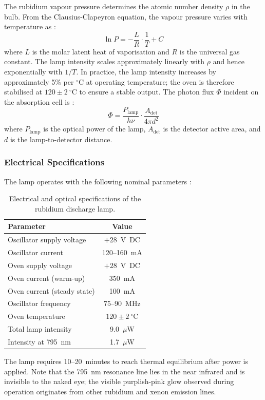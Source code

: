 The rubidium vapour pressure determines the atomic number density $\rho$ in the bulb.
From the Clausius-Clapeyron equation, the vapour pressure varies with temperature as :
\begin{equation}
    \ln P = -\frac{L}{R}\cdot\frac{1}{T} + C
    \label{eq:vapour_pressure}
\end{equation}
where $L$ is the molar latent heat of vaporisation and $R$ is the universal gas constant.
The lamp intensity scales approximately linearly with $\rho$ and hence exponentially with
$1/T$. In practice, the lamp intensity increases by approximately 5\% per $^\circ$C at
operating temperature; the oven is therefore stabilised at $120 \pm 2\ ^\circ$C to ensure
a stable output. The photon flux $\Phi$ incident on the absorption cell is :
\begin{equation}
    \Phi = \frac{P_{\text{lamp}}}{h\nu} \cdot \frac{A_{\text{det}}}{4\pi d^2}
    \label{eq:photon_flux}
\end{equation}
where $P_{\text{lamp}}$ is the optical power of the lamp, $A_{\text{det}}$ is the
detector active area, and $d$ is the lamp-to-detector distance.
 
\subsubsection*{Electrical Specifications}
 
The lamp operates with the following nominal parameters :
 
\begin{table}[h]
    \centering
    \begin{tabular}{lc}
        \hline
        Parameter & Value \\
        \hline
        Oscillator supply voltage  & $+28$~V~DC \\
        Oscillator current         & 120--160~mA \\
        Oven supply voltage        & $+28$~V~DC \\
        Oven current (warm-up)     & 350~mA \\
        Oven current (steady state)& 100~mA \\
        Oscillator frequency       & 75--90~MHz \\
        Oven temperature           & $120 \pm 2\ ^\circ$C \\
        Total lamp intensity       & 9.0~$\mu$W \\
        Intensity at 795~nm        & 1.7~$\mu$W \\
        \hline
    \end{tabular}
    \caption{Electrical and optical specifications of the rubidium discharge lamp.}
    \label{tab:lamp_specs}
\end{table}
 
\noindent
The lamp requires 10--20~minutes to reach thermal equilibrium after power is applied.
Note that the 795~nm resonance line lies in the near infrared and is invisible to the
naked eye; the visible purplish-pink glow observed during operation originates from other
rubidium and xenon emission lines.
 